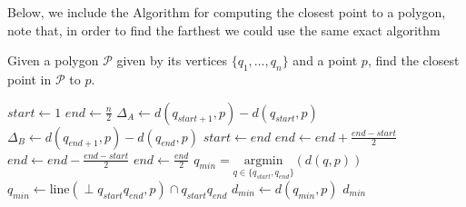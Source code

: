 \documentclass[a4paper, 10pt]{article}
\begin{document}

\begin{figure}[h!]
\end{figure}

Below, we include the Algorithm for computing the closest point to a polygon, note that, in order to find the farthest we could use the same exact algorithm
\begin{algorithm}
    \caption{Given a polygon $\mathcal{P}$ given by its vertices $\lbrace q_1, \dots, q_n\rbrace$ and a point $p$, find the closest point in $\mathcal{P}$ to $p$. \label{alg:closest}}
  \begin{multicols}{2}
  \begin{algorithmic}[1]
        \State $start \gets 1$
        \State $end \gets \frac{n}{2}$
            \State $\Delta_A \gets d(q_{start + 1}, p) - d(q_{start}, p)$
            \State $\Delta_B \gets d(q_{end + 1}, p) - d(q_{end}, p)$
                \Case{$+ +$}
                \EndCase
                \Case{$+ -$}
                    \State $start \gets end$ 
                    \State $end \gets end + \frac{end - start}{2}$
                \EndCase
                \Case{$- +$}
                    \State $end \gets end - \frac{end - start}{2}$
                \EndCase
                \Case{$- -$}
                    \State $end \gets \frac{end}{2}$
                \EndCase
            \EndSwitch
        \EndWhile
            \State $q_{min} = \underset{q \in \lbrace q_{start}, q_{end}\rbrace}{\text{argmin}}{(d(q, p))}$
        \Else
            \State $q_{min} \gets \text{line}(\perp q_{start}q_{end}, p) \cap q_{start}q_{end}$
        \EndIf
        \State $d_{min} \gets d(q_{min}, p)$
        \State \Return $d_{min}$
  \end{algorithmic}
  \end{multicols}
\end{algorithm}
\end{document}
